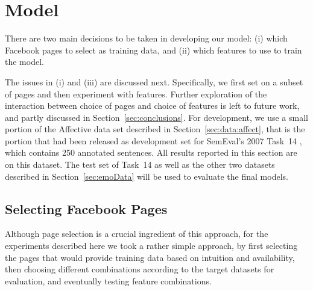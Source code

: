 \documentclass[11pt]{article}
\begin{document}




\section{Model}
\label{sec:model}


There are two main decisions to be taken in developing our model: (i) which Facebook pages to select as training data, and (ii) which features to use to train the model. 

  
  The issues in (i) and (iii) are discussed next. Specifically, we first set on a subset of pages and then experiment with features. Further exploration of the interaction between choice of pages and choice of features is left to future work, and partly discussed in Section~\ref{sec:conclusions}. For development, we use a small portion of the Affective data set described in Section~\ref{sec:data:affect}, that is the portion that had been released as development set for SemEval's 2007 Task~14 \cite{strapparava2007semeval}, which contains 250 annotated sentences. All results reported in this section are on this dataset.
  The test set of Task~14 as well as the other two datasets described in Section~\ref{sec:emoData} will be used to evaluate the final models.




\subsection{Selecting Facebook Pages}
\label{sec:selecting}

Although page selection is a crucial ingredient of this approach, for the experiments described here we took a rather simple approach, by first selecting the pages that would provide training data based on intuition and availability, then choosing different combinations according to the target datasets for evaluation, and eventually testing feature combinations. 
\end{document}
